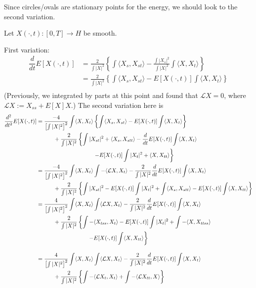 \documentclass[12pt, a4paper]{amsart}
\theoremstyle{remark}
\begin{document}
Since circles/ovals are stationary points for the energy, we should look to the second variation.

Let $X(\cdot,t): [0,T]\to H$ be smooth.   

First variation:
\begin{align*}
\dfrac{d}{dt}E[X(\cdot,t)]&=\frac2{\int|X|^2}
\left\lbrace    \int \langle X_s,X_{st}\rangle - \frac{\int |X_s|^2}{\int |X|^2}\int\langle X,X_t\rangle \right\rbrace \\
&=  \frac2{\int|X|^2}
\left\lbrace    \int \langle X_s,X_{st}\rangle - E[X(\cdot,t)] \int\langle X,X_t\rangle \right\rbrace \\
\end{align*}
(Previously, we integrated by parts at this point and found that $\mathcal{L}X=0$, where $\mathcal{L}X:=X_{ss}+E[X]X$.)    The second variation here is
\begin{align*}
\allowdisplaybreaks
\dfrac{d^2}{dt^2}E[X(\cdot,t)]&=\frac{-4}{\left[\int|X|^2\right]^2}    \int \langle X,X_t\rangle
\left\lbrace    \int \langle X_s,X_{st}\rangle - E[X(\cdot,t)] \int\langle X,X_t\rangle \right\rbrace \\
&\quad\quad\quad 
+\frac2{\int|X|^2}
\left\lbrace   \int  |X_{st}|^2 +\langle X_{s},X_{stt}\rangle - \dfrac{d}{dt}E[X(\cdot,t)]  \int\langle X,X_t\rangle  \right. \\
&\quad\quad\quad \quad\quad\quad\quad\quad \quad\quad\left.  - E[X(\cdot,t)] \int |X_t|^2 +\langle X,X_{tt}\rangle 
\right\rbrace \\
&= \frac{-4}{\left[\int|X|^2\right]^2} \int \langle X,X_t\rangle
    \int   -\langle \mathcal{L}X,X_t\rangle   - \frac2{\int|X|^2} \dfrac{d}{dt}E[X(\cdot,t)]  \int\langle X,X_t\rangle
      \\
&\quad\quad\quad 
+\frac2{\int|X|^2}
\left\lbrace   \int  |X_{st}|^2 - E[X(\cdot,t)] \int |X_t|^2 +\int \langle X_{s},X_{stt}\rangle - E[X(\cdot,t)] \int \langle X,X_{tt}\rangle \right\rbrace
 \\
&= \frac{4}{\left[\int|X|^2\right]^2} \int \langle X,X_t\rangle
    \int   \langle \mathcal{L}X,X_t\rangle    
     - \frac2{\int|X|^2} \dfrac{d}{dt}E[X(\cdot,t)]  \int\langle X,X_t\rangle  
      \\
&\quad\quad\quad
+\frac2{\int|X|^2}
\left\lbrace   \int  -\langle X_{tss},X_t\rangle  - E[X(\cdot,t)] \int |X_t|^2 +\int - \langle X,X_{ttss}\rangle \right. \\
&\quad\quad\quad  \quad\quad\quad \quad\quad\quad  \left. - E[X(\cdot,t)] \int \langle X,X_{tt}\rangle \right\rbrace
 \\
      \intertext{    }
&= \frac{4}{\left[\int|X|^2\right]^2} \int \langle X,X_t\rangle
    \int   \langle \mathcal{L}X,X_t\rangle 
     - \frac2{\int|X|^2} \dfrac{d}{dt}E[X(\cdot,t)]  \int\langle X,X_t\rangle 
      \\
&\quad\quad\quad 
+\frac2{\int|X|^2}
\left\lbrace   \int  -\langle \mathcal{L}X_{t},X_t\rangle   +\int -  \langle \mathcal{L}X_{tt},X \rangle\right\rbrace
 \\
\end{align*}
\end{document}
